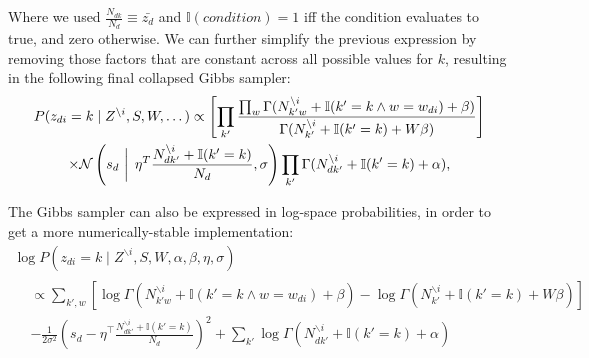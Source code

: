\documentclass{article} %
\begin{document}
Where we used $ \frac{N_{dk}}{N_d} \equiv \bar{z_d} $ and $\mathbb{I}(condition) = 1$ iff the condition evaluates to true, and zero otherwise. We can further simplify the previous expression by removing those factors that are constant across all possible values for $k$, resulting in the following final collapsed Gibbs sampler:
\begin{equation}
\begin{gathered}
P(z_{di} = k \mid Z^{\backslash{i}}, S, W, \dots) \propto \left[ \prod_{k'} \frac{\prod_w \Gamma(N_{{k'}w}^{\backslash i} + \mathbb{I}(k' = k \wedge w = w_{di}) + \beta)}{\Gamma(N_{k'}^{\backslash i} + \mathbb{I}(k' = k) + W \beta)} \right]  \\
\times \mathcal{N}\left(s_d\, \left| \vphantom{\frac{1}{1}} \right. \, \eta^T \frac{N_{d{k'}}^{\backslash i} + \mathbb{I}(k' = k)}{N_d}, \sigma \right) \prod_{k'} \Gamma(N_{d{k'}}^{\backslash i} + \mathbb{I}(k' = k) + \alpha),
\end{gathered}
\end{equation}

The Gibbs sampler can also be expressed in log-space probabilities, in order to get a more numerically-stable implementation:
\begin{equation*}
\begin{gathered}
\log P(z_{di} = k \mid Z^{\backslash{i}}, S, W, \alpha, \beta, \eta, \sigma)\\
\begin{aligned}
&\propto\sum_{k',w} \left[ \log \Gamma(N_{{k'}w}^{\backslash i} + \mathbb{I}(k' = k \wedge w = w_{di}) + \beta) - \log \Gamma(N_{k'}^{\backslash i} + \mathbb{I}(k' = k) + W \beta) \right]\\
&-\frac{1}{2 \sigma^2}\left(s_d - \eta^\top \frac{N_{d{k'}}^{\backslash i} + \mathbb{I}(k' = k)}{N_d}\right)^2 + \sum_{k'} \log \Gamma(N_{d{k'}}^{\backslash i} + \mathbb{I}(k' = k) + \alpha)
\end{aligned}
\end{gathered}
\end{equation*}
\end{document}
